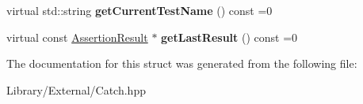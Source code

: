 \begin{DoxyCompactItemize}
\item 
\hypertarget{struct_catch_1_1_i_result_capture_aea1617f4a84cc648246aa3ed6918b5bf}{}virtual std\+::string {\bfseries get\+Current\+Test\+Name} () const =0\label{struct_catch_1_1_i_result_capture_aea1617f4a84cc648246aa3ed6918b5bf}

\item 
\hypertarget{struct_catch_1_1_i_result_capture_ab18872c89fab97405a56e9c6a4919736}{}virtual const \hyperlink{class_catch_1_1_assertion_result}{Assertion\+Result} $\ast$ {\bfseries get\+Last\+Result} () const =0\label{struct_catch_1_1_i_result_capture_ab18872c89fab97405a56e9c6a4919736}

\end{DoxyCompactItemize}


The documentation for this struct was generated from the following file\+:\begin{DoxyCompactItemize}
\item 
Library/\+External/Catch.\+hpp\end{DoxyCompactItemize}
